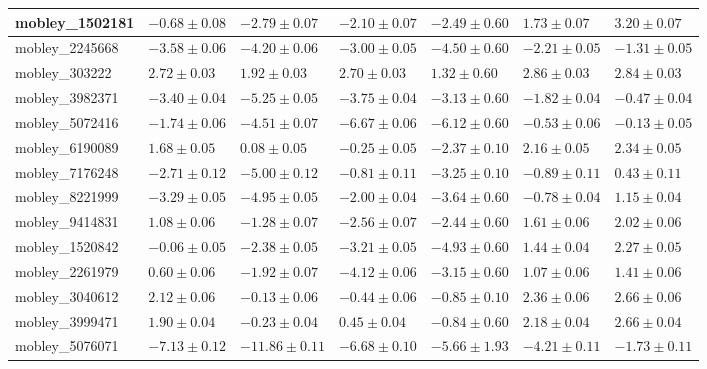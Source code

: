 \documentclass{article}
\begin{document}
\begin{landscape}
\begin{longtable}{|l{3.0cm}|l{3.0cm}|l{3.2cm}|l{3.6cm}|l{3.0cm}|l{3.0cm}|l{3.0cm}|}
mobley\_1502181	&	$	-0.68	\pm	0.08	$	&	$	-2.79	\pm	0.07	$	&	$	-2.10	\pm	0.07	$	&	$	-2.49	\pm	0.60	$	&	$	1.73	\pm	0.07	$	&	$	3.20	\pm	0.07	$	\\ \hline
mobley\_2245668	&	$	-3.58	\pm	0.06	$	&	$	-4.20	\pm	0.06	$	&	$	-3.00	\pm	0.05	$	&	$	-4.50	\pm	0.60	$	&	$	-2.21	\pm	0.05	$	&	$	-1.31	\pm	0.05	$	\\ \hline
mobley\_303222	&	$	2.72	\pm	0.03	$	&	$	1.92	\pm	0.03	$	&	$	2.70	\pm	0.03	$	&	$	1.32	\pm	0.60	$	&	$	2.86	\pm	0.03	$	&	$	2.84	\pm	0.03	$	\\ \hline
mobley\_3982371	&	$	-3.40	\pm	0.04	$	&	$	-5.25	\pm	0.05	$	&	$	-3.75	\pm	0.04	$	&	$	-3.13	\pm	0.60	$	&	$	-1.82	\pm	0.04	$	&	$	-0.47	\pm	0.04	$	\\ \hline
mobley\_5072416	&	$	-1.74	\pm	0.06	$	&	$	-4.51	\pm	0.07	$	&	$	-6.67	\pm	0.06	$	&	$	-6.12	\pm	0.60	$	&	$	-0.53	\pm	0.06	$	&	$	-0.13	\pm	0.05	$	\\ \hline
mobley\_6190089	&	$	1.68	\pm	0.05	$	&	$	0.08	\pm	0.05	$	&	$	-0.25	\pm	0.05	$	&	$	-2.37	\pm	0.10	$	&	$	2.16	\pm	0.05	$	&	$	2.34	\pm	0.05	$	\\ \hline
mobley\_7176248	&	$	-2.71	\pm	0.12	$	&	$	-5.00	\pm	0.12	$	&	$	-0.81	\pm	0.11	$	&	$	-3.25	\pm	0.10	$	&	$	-0.89	\pm	0.11	$	&	$	0.43	\pm	0.11	$	\\ \hline
mobley\_8221999	&	$	-3.29	\pm	0.05	$	&	$	-4.95	\pm	0.05	$	&	$	-2.00	\pm	0.04	$	&	$	-3.64	\pm	0.60	$	&	$	-0.78	\pm	0.04	$	&	$	1.15	\pm	0.04	$	\\ \hline
mobley\_9414831	&	$	1.08	\pm	0.06	$	&	$	-1.28	\pm	0.07	$	&	$	-2.56	\pm	0.07	$	&	$	-2.44	\pm	0.60	$	&	$	1.61	\pm	0.06	$	&	$	2.02	\pm	0.06	$	\\ \hline
mobley\_1520842	&	$	-0.06	\pm	0.05	$	&	$	-2.38	\pm	0.05	$	&	$	-3.21	\pm	0.05	$	&	$	-4.93	\pm	0.60	$	&	$	1.44	\pm	0.04	$	&	$	2.27	\pm	0.05	$	\\ \hline
mobley\_2261979	&	$	0.60	\pm	0.06	$	&	$	-1.92	\pm	0.07	$	&	$	-4.12	\pm	0.06	$	&	$	-3.15	\pm	0.60	$	&	$	1.07	\pm	0.06	$	&	$	1.41	\pm	0.06	$	\\ \hline
mobley\_3040612	&	$	2.12	\pm	0.06	$	&	$	-0.13	\pm	0.06	$	&	$	-0.44	\pm	0.06	$	&	$	-0.85	\pm	0.10	$	&	$	2.36	\pm	0.06	$	&	$	2.66	\pm	0.06	$	\\ \hline
mobley\_3999471	&	$	1.90	\pm	0.04	$	&	$	-0.23	\pm	0.04	$	&	$	0.45	\pm	0.04	$	&	$	-0.84	\pm	0.60	$	&	$	2.18	\pm	0.04	$	&	$	2.66	\pm	0.04	$	\\ \hline
mobley\_5076071	&	$	-7.13	\pm	0.12	$	&	$	-11.86	\pm	0.11	$	&	$	-6.68	\pm	0.10	$	&	$	-5.66	\pm	1.93	$	&	$	-4.21	\pm	0.11	$	&	$	-1.73	\pm	0.11	$	\\ \hline

\end{longtable}
\end{landscape}
\end{document}
